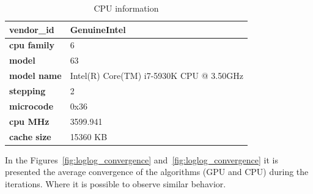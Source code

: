\documentclass{article}
\begin{document}
    \begin{table}[!htb]
        \centering
        \caption{CPU information}
        \label{tbl:cpuinfo}
        \begin{tabular}{|l|l|}
            \hline
            \textbf{vendor\_id} & GenuineIntel                             \\ \hline
            \textbf{cpu family} & 6                                        \\ \hline
            \textbf{model}      & 63                                       \\ \hline
            \textbf{model name} & Intel(R) Core(TM) i7-5930K CPU @ 3.50GHz \\ \hline
            \textbf{stepping}   & 2                                        \\ \hline
            \textbf{microcode}  & 0x36                                     \\ \hline
            \textbf{cpu MHz}    & 3599.941                                 \\ \hline
            \textbf{cache size} & 15360 KB                                 \\ \hline
        \end{tabular}
    \end{table}

    In the Figures~\ref{fig:loglog_convergence} and~\ref{fig:loglog_convergence} it is presented the average convergence of the algorithms (GPU and CPU) during the iterations. Where it is possible to observe similar behavior.

\end{document}
